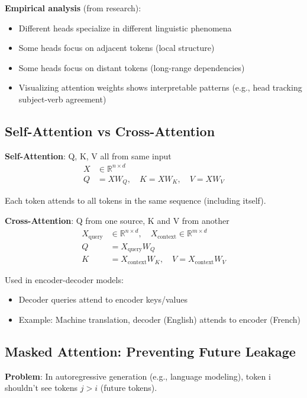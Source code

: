 \documentclass[11pt,oneside]{book}
\begin{document}
\textbf{Empirical analysis} (from research):
\begin{itemize}
\item Different heads specialize in different linguistic phenomena
\item Some heads focus on adjacent tokens (local structure)
\item Some heads focus on distant tokens (long-range dependencies)
\item Visualizing attention weights shows interpretable patterns (e.g., head tracking subject-verb agreement)
\end{itemize}

\subsection{Self-Attention vs Cross-Attention}

\textbf{Self-Attention}: Q, K, V all from same input
\begin{align*}
X &\in \mathbb{R}^{n \times d} \\
Q &= XW_Q, \quad K = XW_K, \quad V = XW_V
\end{align*}

Each token attends to all tokens in the same sequence (including itself).

\textbf{Cross-Attention}: Q from one source, K and V from another
\begin{align*}
X_{\text{query}} &\in \mathbb{R}^{n \times d}, \quad X_{\text{context}} \in \mathbb{R}^{m \times d} \\
Q &= X_{\text{query}} W_Q \\
K &= X_{\text{context}} W_K, \quad V = X_{\text{context}} W_V
\end{align*}

Used in encoder-decoder models:
\begin{itemize}
\item Decoder queries attend to encoder keys/values
\item Example: Machine translation, decoder (English) attends to encoder (French)
\end{itemize}

\subsection{Masked Attention: Preventing Future Leakage}

\textbf{Problem}: In autoregressive generation (e.g., language modeling), token i shouldn't see tokens $j > i$ (future tokens).
\end{document}

